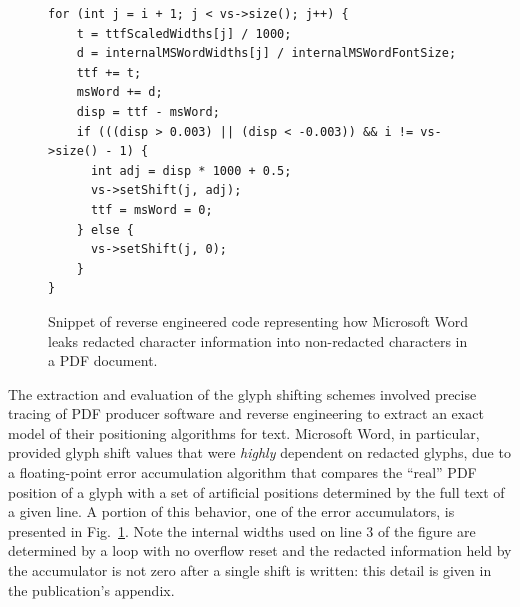 
\begin{figure}
\begin{lstlisting}
for (int j = i + 1; j < vs->size(); j++) {
    t = ttfScaledWidths[j] / 1000;
    d = internalMSWordWidths[j] / internalMSWordFontSize;
    ttf += t;
    msWord += d;
    disp = ttf - msWord;
    if (((disp > 0.003) || (disp < -0.003)) && i != vs->size() - 1) {
      int adj = disp * 1000 + 0.5;
      vs->setShift(j, adj);
      ttf = msWord = 0;
    } else {
      vs->setShift(j, 0);
    }
}
\end{lstlisting}
\caption{Snippet of reverse engineered code representing how Microsoft Word leaks redacted character information into non-redacted characters in a PDF document.
    }
\label{fig:msword-snippet}
\end{figure}

The extraction and evaluation of the glyph shifting schemes involved precise tracing of PDF producer software and reverse engineering to extract an exact model of their positioning algorithms for text. 
Microsoft Word, in particular, provided glyph shift values that were \emph{highly} dependent on redacted glyphs, due to a floating-point error accumulation algorithm that compares the ``real'' PDF position of a glyph with a set of artificial positions determined by the full text of a given line.
A portion of this behavior, one of the error accumulators, is presented in Fig.~\ref{fig:msword-snippet}.
Note the internal widths used on line 3 of the figure are determined by a loop with no overflow reset and the redacted information held by the accumulator is not zero after a single shift is written: this detail is given in the publication's appendix.

